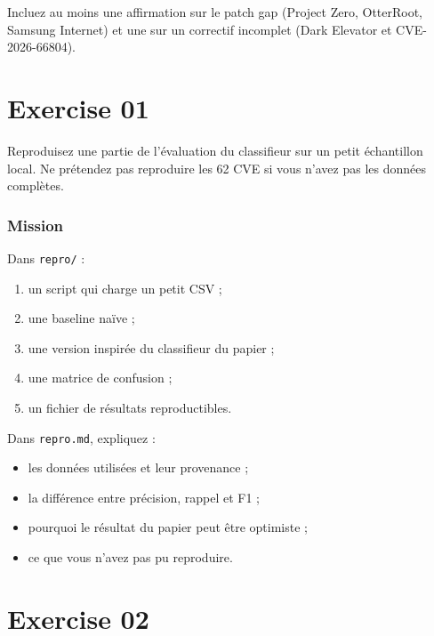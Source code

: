 \documentclass{training}
\begin{document}
Incluez au moins une affirmation sur le patch gap (Project Zero,
OtterRoot, Samsung Internet) et une sur un correctif incomplet
(Dark Elevator et CVE-2026-66804).


\chapter{Exercise 01}
\makeheaderfiles

Reproduisez une partie de l'évaluation du classifieur sur un petit
échantillon local. Ne prétendez pas reproduire les 62 CVE si vous n'avez
pas les données complètes.

\subsection*{Mission}

Dans \texttt{repro/} :

\begin{enumerate}
  \item un script qui charge un petit CSV ;
  \item une baseline naïve ;
  \item une version inspirée du classifieur du papier ;
  \item une matrice de confusion ;
  \item un fichier de résultats reproductibles.
\end{enumerate}

Dans \texttt{repro.md}, expliquez :

\begin{itemize}
  \item les données utilisées et leur provenance ;
  \item la différence entre précision, rappel et F1 ;
  \item pourquoi le résultat du papier peut être optimiste ;
  \item ce que vous n'avez pas pu reproduire.
\end{itemize}

\chapter{Exercise 02}
\makeheaderfiles
\end{document}
